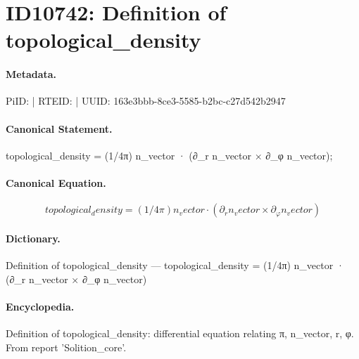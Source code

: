 \section*{ID10742: Definition of topological\_density}
\paragraph{Metadata.}
PiID:  | RTEID:  | UUID: 163e3bbb-8ce3-5585-b2bc-c27d542b2947

\paragraph{Canonical Statement.}
topological\_density = (1/4π) n\_vector · (∂\_r n\_vector × ∂\_φ n\_vector);

\paragraph{Canonical Equation.}
\[
topological_density = (1/4π) n_vector · (∂_r n_vector × ∂_φ n_vector)
\]

\paragraph{Dictionary.}
Definition of topological\_density — topological\_density = (1/4π) n\_vector · (∂\_r n\_vector × ∂\_φ n\_vector)

\paragraph{Encyclopedia.}
Definition of topological\_density: differential equation relating π, n\_vector, r, φ. From report 'Solition\_core'.
